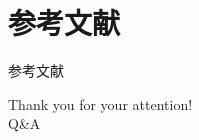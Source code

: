 \documentclass[
10pt,
aspectratio=169,
]{beamer}
\begin{document}
\section{参考文献}
\begin{frame}[allowframebreaks]{参考文献}
	 
	\nocite{*} 
	
\end{frame}

\begin{frame}[plain]
	\vfill
	\centering
	{
		\centering \Huge \color{white} Thank you for your attention!\\[10pt]Q\&A
	}
	\vfill
\end{frame}
\end{document}
